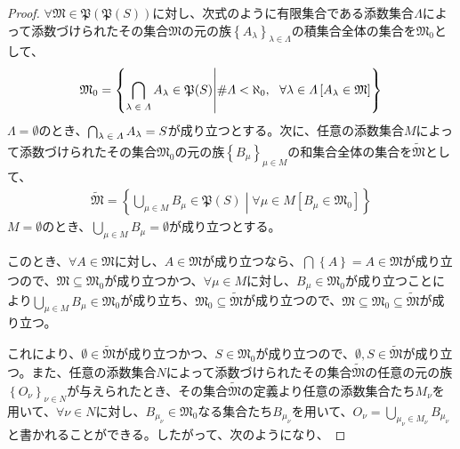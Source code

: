 \documentclass[dvipdfmx]{jsarticle}
\begin{document}
\begin{proof}
$\mathfrak{\forall M \in P}\left( \mathfrak{P}(S) \right)$に対し、次式のように有限集合である添数集合$\varLambda$によって添数づけられたその集合$\mathfrak{M}$の元の族$\left\{ A_{\lambda} \right\}_{\lambda \in \varLambda}$の積集合全体の集合を$\mathfrak{M}_{0}$として、
\begin{align*}
\mathfrak{M}_{0} = \left\{ \bigcap_{\scriptsize \begin{matrix}
\lambda \in \varLambda \\
\end{matrix}} A_{\lambda}\in \mathfrak{P}(S) \middle| {\#}\varLambda < \aleph_{0},\ \ \forall\lambda \in \varLambda\left[ A_{\lambda}\in \mathfrak{M} \right] \right\}
\end{align*}
$\varLambda = \emptyset$のとき、$\bigcap_{\scriptsize \begin{matrix}
\lambda \in \varLambda \\
\end{matrix}} A_{\lambda} = S$が成り立つとする。次に、任意の添数集合$M$によって添数づけられたその集合$\mathfrak{M}_{0}$の元の族$\left\{ B_{\mu} \right\}_{\mu \in M}$の和集合全体の集合を$\widetilde{\mathfrak{M}}$として、
\begin{align*}
\widetilde{\mathfrak{M}} = \left\{ \bigcup_{\mu \in M} B_{\mu}\in \mathfrak{P}(S) \middle| \forall\mu \in M\left[ B_{\mu} \in \mathfrak{M}_{0} \right] \right\}
\end{align*}
$M = \emptyset$のとき、$\bigcup_{\mu \in M} B_{\mu} = \emptyset$が成り立つとする。\par
このとき、$\forall A \in \mathfrak{M}$に対し、$A \in \mathfrak{M}$が成り立つなら、$\bigcap_{} \left\{ A \right\} = A \in \mathfrak{M}$が成り立つので、$\mathfrak{M \subseteq}\mathfrak{M}_{0}$が成り立つかつ、$\forall\mu \in M$に対し、$B_{\mu} \in \mathfrak{M}_{0}$が成り立つことにより$\bigcup_{\mu \in M} B_{\mu} \in \mathfrak{M}_{0}$が成り立ち、$\mathfrak{M}_{0} \subseteq \widetilde{\mathfrak{M}}$が成り立つので、$\mathfrak{M \subseteq}\mathfrak{M}_{0} \subseteq \widetilde{\mathfrak{M}}$が成り立つ。\par
これにより、$\emptyset \in \widetilde{\mathfrak{M}}$が成り立つかつ、$S \in \mathfrak{M}_{0}$が成り立つので、$\emptyset,S \in \widetilde{\mathfrak{M}}$が成り立つ。また、任意の添数集合$N$によって添数づけられたその集合$\widetilde{\mathfrak{M}}$の任意の元の族$\left\{ O_{\nu} \right\}_{\nu \in N}$が与えられたとき、その集合$\widetilde{\mathfrak{M}}$の定義より任意の添数集合たち$M_{\nu}$を用いて、$\forall\nu \in N$に対し、$B_{\mu_{\nu}} \in \mathfrak{M}_{0}$なる集合たち$B_{\mu_{\nu}}$を用いて、$O_{\nu} = \bigcup_{\mu_{\nu} \in M_{\nu}} B_{\mu_{\nu}}$と書かれることができる。したがって、次のようになり、

\end{proof}
\end{document}
